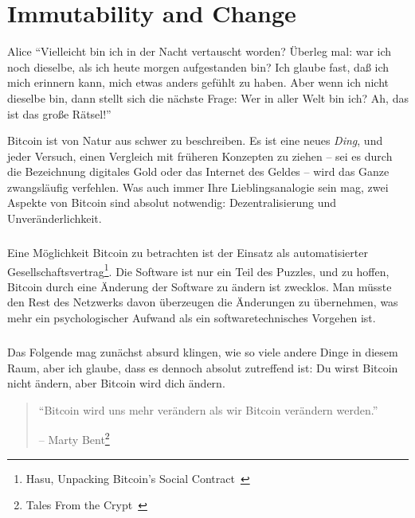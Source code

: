 \chapter{Immutability and Change}
\label{les:1}

\begin{chapquote}{Alice}
\enquote{Vielleicht bin ich in der Nacht vertauscht worden? Überleg mal: war ich
noch dieselbe, als ich heute morgen aufgestanden bin? Ich glaube fast, daß ich
mich erinnern kann, mich etwas anders gefühlt zu haben. Aber wenn ich nicht
dieselbe bin, dann stellt sich die nächste Frage: Wer in aller Welt bin ich? Ah,
das ist das große Rätsel!}
\end{chapquote}

Bitcoin ist von Natur aus schwer zu beschreiben. Es ist eine neues
\textit{Ding}, und jeder Versuch, einen Vergleich mit früheren Konzepten zu
ziehen – sei es durch die Bezeichnung digitales Gold oder das Internet des
Geldes – wird das Ganze zwangsläufig verfehlen. Was auch immer Ihre
Lieblingsanalogie sein mag, zwei Aspekte von Bitcoin sind absolut notwendig:
Dezentralisierung und Unveränderlichkeit.

\paragraph{}
Eine Möglichkeit Bitcoin zu betrachten ist der Einsatz als automatisierter
Gesellschaftsvertrag\footnote{Hasu, Unpacking Bitcoin's Social
Contract~\cite{social-contract}}. Die Software ist nur ein Teil des Puzzles, und
zu hoffen, Bitcoin durch eine Änderung der Software zu ändern ist zwecklos. Man
müsste den Rest des Netzwerks davon überzeugen die Änderungen zu übernehmen, was
mehr ein psychologischer Aufwand als ein softwaretechnisches Vorgehen ist.

\paragraph{}
Das Folgende mag zunächst absurd klingen, wie so viele andere Dinge in diesem
Raum, aber ich glaube, dass es dennoch absolut zutreffend ist: Du wirst Bitcoin
nicht ändern, aber Bitcoin wird dich ändern.

\begin{quotation}\begin{samepage}
\enquote{Bitcoin wird uns mehr verändern als wir Bitcoin verändern werden.}
\begin{flushright} -- Marty Bent\footnote{Tales From the Crypt~\cite{tftc21}}
\end{flushright}\end{samepage}\end{quotation}

